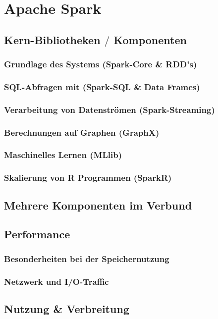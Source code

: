 \newpage
\chapter{Apache Spark} 

\section{Kern-Bibliotheken $\slash$ Komponenten}
\subsection{Grundlage des Systems (Spark-Core \& RDD’s)}
\subsection{SQL-Abfragen mit (Spark-SQL \& Data Frames)}
\subsection{Verarbeitung von Datenströmen (Spark-Streaming)}
\subsection{Berechnungen auf Graphen (GraphX)}
\subsection{Maschinelles Lernen (MLlib)}
\subsection{Skalierung von R Programmen (SparkR)}
\section{Mehrere Komponenten im Verbund}
\section{Performance}
\subsection{Besonderheiten bei der Speichernutzung}
\subsection{Netzwerk und I/O-Traffic}
\section{Nutzung \& Verbreitung}
